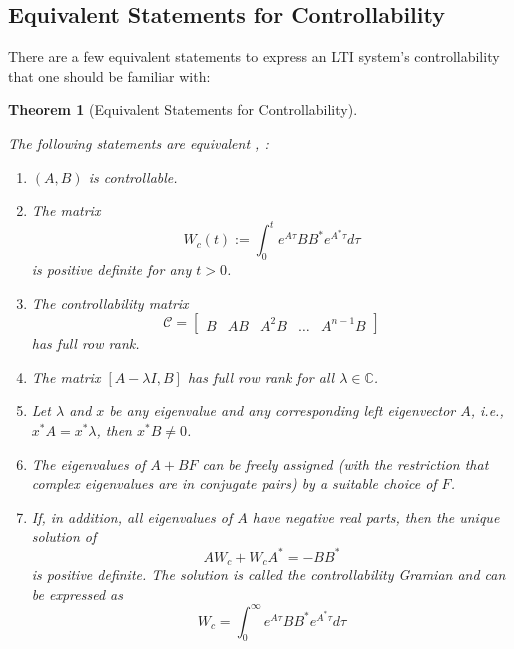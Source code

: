 \documentclass[
]{book}
\newtheorem{theorem}{Theorem}[chapter]
\theoremstyle{definition}
\theoremstyle{definition}
\theoremstyle{definition}
\theoremstyle{definition}
\theoremstyle{remark}
\begin{document}
\subsection{Equivalent Statements for Controllability}\label{equivalent-statements-for-controllability}

There are a few equivalent statements to express an LTI system's controllability that one should be familiar with:

\begin{theorem}[Equivalent Statements for Controllability]
\protect\hypertarget{thm:lticontrollable}{}\label{thm:lticontrollable}

The following statements are equivalent \citep{chen1984book-linear}, \citep{zhou1996book-robust}:

\begin{enumerate}
\def\labelenumi{\arabic{enumi}.}
\item
  \((A, B)\) is controllable.
\item
  The matrix
  \[
  W_c(t) := \int_{0}^{t} e^{A\tau} B B^* e^{A^* \tau} d\tau
  \]
  is positive definite for any \(t > 0\).
\item
  The controllability matrix
  \[
  \mathcal{C} = \begin{bmatrix}
     B & AB & A^2 B & \dots & A^{n-1} B 
  \end{bmatrix}
  \]
  has full row rank.
\item
  The matrix \([A - \lambda I, B]\) has full row rank for all \(\lambda \in \mathbb{C}\).
\item
  Let \(\lambda\) and \(x\) be any eigenvalue and any corresponding left eigenvector \(A\), i.e., \(x^* A = x^* \lambda\), then \(x^* B \ne 0\).
\item
  The eigenvalues of \(A+BF\) can be freely assigned (with the restriction that complex eigenvalues are in conjugate pairs) by a suitable choice of \(F\).
\item
  If, in addition, all eigenvalues of \(A\) have negative real parts, then the unique solution of
  \[ 
  A W_c + W_c A^* = -B B^* 
  \]
  is positive definite. The solution is called the \emph{controllability Gramian} and can be expressed as
  \[
  W_c = \int_{0}^{\infty} e^{A \tau} B B^* e^{A^* \tau} d\tau
  \]
\end{enumerate}

\end{theorem}
\end{document}
